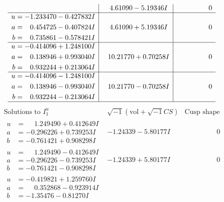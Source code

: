 \documentclass[1p]{elsarticle_modified}
\theoremstyle{definition}
\newcommand{\I}{\sqrt{-1}}
\begin{document}
$$\begin{array}{c|c|c}
 & \phantom{-}4.61090 - 5.19346 I & \phantom{-0.000000 } 0 \\ \hline\begin{aligned}
u &= -1.233470 - 0.427832 I \\
a &= \phantom{-}0.454725 - 0.407824 I \\
b &= \phantom{-}0.735861 - 0.578421 I\end{aligned}
 & \phantom{-}4.61090 + 5.19346 I & \phantom{-0.000000 } 0 \\ \hline\begin{aligned}
u &= -0.414096 + 1.248100 I \\
a &= \phantom{-}0.138946 + 0.993040 I \\
b &= \phantom{-}0.932244 + 0.213064 I\end{aligned}
 & \phantom{-}10.21770 + 0.70258 I & \phantom{-0.000000 } 0 \\ \hline\begin{aligned}
u &= -0.414096 - 1.248100 I \\
a &= \phantom{-}0.138946 - 0.993040 I \\
b &= \phantom{-}0.932244 - 0.213064 I\end{aligned}
 & \phantom{-}10.21770 - 0.70258 I & \phantom{-0.000000 } 0\\
 \hline 
 \end{array}$$\newpage$$\begin{array}{c|c|c}  
\text{Solutions to }I^u_{1}& \I (\text{vol} + \sqrt{-1}CS) & \text{Cusp shape}\\
 \hline 
\begin{aligned}
u &= \phantom{-}1.249490 + 0.412649 I \\
a &= -0.296226 + 0.739253 I \\
b &= -0.761421 + 0.908298 I\end{aligned}
 & -1.24339 - 5.80177 I & \phantom{-0.000000 } 0 \\ \hline\begin{aligned}
u &= \phantom{-}1.249490 - 0.412649 I \\
a &= -0.296226 - 0.739253 I \\
b &= -0.761421 - 0.908298 I\end{aligned}
 & -1.24339 + 5.80177 I & \phantom{-0.000000 } 0 \\ \hline\begin{aligned}
u &= -0.419821 + 1.259760 I \\
a &= \phantom{-}0.352868 - 0.923914 I \\
b &= -1.35476 - 0.81270 I\end{aligned}

\end{array}$$
\end{document}
